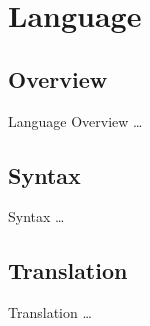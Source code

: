 \section{Language}
\subsection{Overview}
\begin{frame}{Language Overview}
    \dots
\end{frame}

\subsection{Syntax}
\begin{frame}{Syntax}
    \dots
\end{frame}

\subsection{Translation}
\begin{frame}{Translation}
    \dots
\end{frame}

